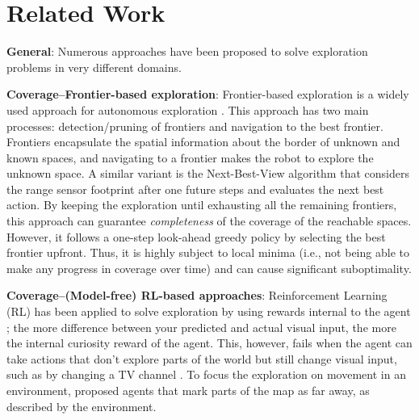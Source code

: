 \documentclass{article}
\newcommand{\ph}[1]{{\textbf{#1}:}} %
\begin{document}

\section{Related Work}

\ph{General}
Numerous approaches have been proposed to solve exploration problems in very different domains.

\ph{Coverage--Frontier-based exploration}
Frontier-based exploration is a widely used approach for autonomous exploration \cite{yamauchi1997frontier,tao2007motion,keidar2012robot,heng2015efficient}.
This approach has two main processes: detection/pruning of frontiers and navigation to the best frontier.
Frontiers encapsulate the spatial information about the border of unknown and known spaces, and navigating to a frontier makes the robot to explore the unknown space.
A similar variant is the Next-Best-View algorithm that considers the range sensor footprint after one future steps and evaluates the next best action. \cite{gonzalez2002navigation,grabowski2003autonomous}
%
By keeping the exploration until exhausting all the remaining frontiers, this approach can guarantee \textit{completeness} of the coverage of the reachable spaces.
However, it follows a one-step look-ahead greedy policy by selecting the best frontier upfront.
Thus, it is highly subject to local minima (i.e., not being able to make any progress in coverage over time) and can cause significant suboptimality.



\ph{Coverage--(Model-free) RL-based approaches}
Reinforcement Learning (RL) has been applied to solve exploration by using rewards internal to the agent \cite{pathak_icm, rnd}; the more difference between your predicted and actual visual input, the more the internal curiosity reward of the agent. This, however, fails when the agent can take actions that don't explore parts of the world but still change visual input, such as by changing a TV channel \cite{burda2018study}. To focus the exploration on movement in an environment, \citet{ECR2018} proposed agents that mark parts of the map as far away, as described by the environment.
\end{document}
